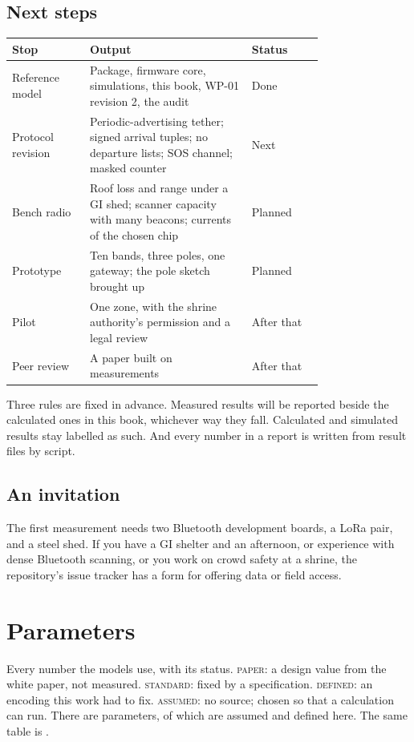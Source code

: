 \documentclass[11pt,a4paper,twoside,openany]{book}
\begin{document}
\section{Next steps}
\begin{center}\small\renewcommand{\arraystretch}{1.3}\begin{tabular}{@{}p{0.25\linewidth}p{0.52\linewidth}l@{}}\toprule
Stop & Output & Status\\\midrule
Reference model & Package, firmware core, simulations, this book, WP-01 revision 2, the audit & Done\\
Protocol revision & Periodic-advertising tether; signed arrival tuples; no departure lists; SOS channel; masked counter & Next\\
Bench radio & Roof loss and range under a GI shed; scanner capacity with many beacons; currents of the chosen chip & Planned\\
Prototype & Ten bands, three poles, one gateway; the pole sketch brought up & Planned\\
Pilot & One zone, with the shrine authority's permission and a legal review & After that\\
Peer review & A paper built on measurements & After that\\\bottomrule\end{tabular}\end{center}

Three rules are fixed in advance. Measured results will be reported beside the calculated ones in this book, whichever
way they fall. Calculated and simulated results stay labelled as such. And every number in a report is written from
result files by script.

\section{An invitation}
The first measurement needs two Bluetooth development boards, a LoRa pair, and a steel shed. If you have a GI shelter
and an afternoon, or experience with dense Bluetooth scanning, or you work on crowd safety at a shrine, the
repository's issue tracker has a form for offering data or field access.

\appendix
\chapter{Parameters}\label{app:params}
Every number the models use, with its status. \textsc{paper}: a design value from the white paper, not measured.
\textsc{standard}: fixed by a specification. \textsc{defined}: an encoding this work had to fix. \textsc{assumed}: no
source; chosen so that a calculation can run. There are \Nparams{} parameters, of which \Nassumed{} are assumed and
\Ndefined{} defined here. The same table is .
\end{document}
